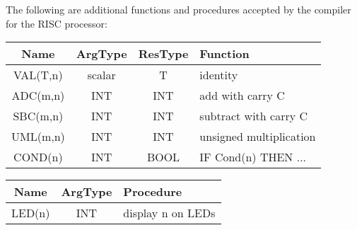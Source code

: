 The following are additional functions and procedures accepted by the compiler for
the RISC processor:
\begin{table}[h!]
  \centering
  \begin{tabular}{c c c l}
    Name     & ArgType & ResType & Function \\\hline
    VAL(T,n) & scalar  & T       & identity \\
    ADC(m,n) & INT & INT & add with carry C \\
    SBC(m,n) & INT & INT & subtract with carry C \\
    UML(m,n) & INT & INT & unsigned multiplication \\
    COND(n)  & INT & BOOL & IF Cond(n) THEN ...
  \end{tabular}
\end{table}
\begin{table}[h!]
  \centering
  \begin{tabular}{c c l}
    Name   & ArgType & Procedure \\\hline
    LED(n) & INT & display n on LEDs
  \end{tabular}
\end{table}
